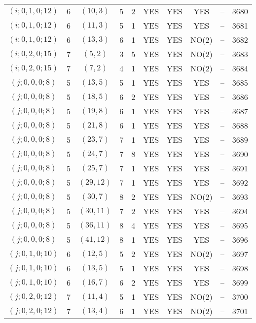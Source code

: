 \begin{longtable}{|c|c|c|c|c|c|c|c|c|c|}
$(i; 0, 1, 0; 12)$ & 6 & $(10, 3)$ & 5 & 2 & YES & YES & YES & -- & 3680\\
$(i; 0, 1, 0; 12)$ & 6 & $(11, 3)$ & 5 & 1 & YES & YES & YES & -- & 3681\\
$(i; 0, 1, 0; 12)$ & 6 & $(13, 3)$ & 6 & 1 & YES & YES & NO(2) & -- & 3682\\
$(i; 0, 2, 0; 15)$ & 7 & $(5, 2)$ & 3 & 5 & YES & YES & NO(2) & -- & 3683\\
$(i; 0, 2, 0; 15)$ & 7 & $(7, 2)$ & 4 & 1 & YES & YES & NO(2) & -- & 3684\\
$(j; 0, 0, 0; 8)$ & 5 & $(13, 5)$ & 5 & 1 & YES & YES & YES & -- & 3685\\
$(j; 0, 0, 0; 8)$ & 5 & $(18, 5)$ & 6 & 2 & YES & YES & YES & -- & 3686\\
$(j; 0, 0, 0; 8)$ & 5 & $(19, 8)$ & 6 & 1 & YES & YES & YES & -- & 3687\\
$(j; 0, 0, 0; 8)$ & 5 & $(21, 8)$ & 6 & 1 & YES & YES & YES & -- & 3688\\
$(j; 0, 0, 0; 8)$ & 5 & $(23, 7)$ & 7 & 1 & YES & YES & YES & -- & 3689\\
$(j; 0, 0, 0; 8)$ & 5 & $(24, 7)$ & 7 & 8 & YES & YES & YES & -- & 3690\\
$(j; 0, 0, 0; 8)$ & 5 & $(25, 7)$ & 7 & 1 & YES & YES & YES & -- & 3691\\
$(j; 0, 0, 0; 8)$ & 5 & $(29, 12)$ & 7 & 1 & YES & YES & YES & -- & 3692\\
$(j; 0, 0, 0; 8)$ & 5 & $(30, 7)$ & 8 & 2 & YES & YES & NO(2) & -- & 3693\\
$(j; 0, 0, 0; 8)$ & 5 & $(30, 11)$ & 7 & 2 & YES & YES & YES & -- & 3694\\
$(j; 0, 0, 0; 8)$ & 5 & $(36, 11)$ & 8 & 4 & YES & YES & YES & -- & 3695\\
$(j; 0, 0, 0; 8)$ & 5 & $(41, 12)$ & 8 & 1 & YES & YES & YES & -- & 3696\\
$(j; 0, 1, 0; 10)$ & 6 & $(12, 5)$ & 5 & 2 & YES & YES & NO(2) & -- & 3697\\
$(j; 0, 1, 0; 10)$ & 6 & $(13, 5)$ & 5 & 1 & YES & YES & YES & -- & 3698\\
$(j; 0, 1, 0; 10)$ & 6 & $(16, 7)$ & 6 & 2 & YES & YES & YES & -- & 3699\\
$(j; 0, 2, 0; 12)$ & 7 & $(11, 4)$ & 5 & 1 & YES & YES & NO(2) & -- & 3700\\
$(j; 0, 2, 0; 12)$ & 7 & $(13, 4)$ & 6 & 1 & YES & YES & NO(2) & -- & 3701
\end{longtable}
